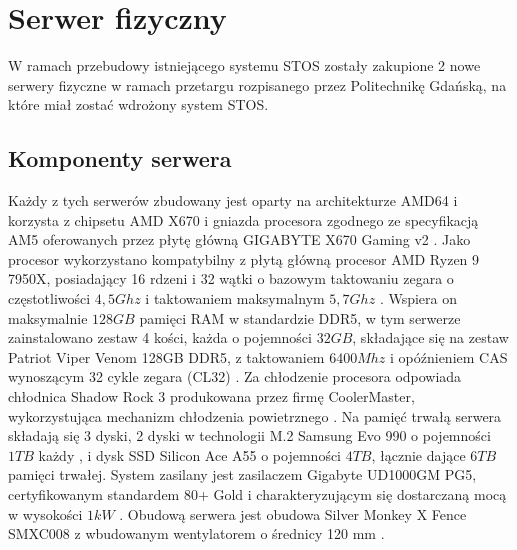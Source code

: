\section{Serwer fizyczny}
W ramach przebudowy istniejącego systemu STOS zostały zakupione 2 nowe serwery fizyczne w ramach przetargu rozpisanego przez Politechnikę Gdańską, na które miał zostać wdrożony system STOS.

\subsection{Komponenty serwera}
Każdy z tych serwerów zbudowany jest oparty na architekturze AMD64 i korzysta z chipsetu AMD X670 i gniazda procesora zgodnego ze specyfikacją AM5 oferowanych przez płytę główną GIGABYTE X670 Gaming v2 \cite{gigabyteX670}. Jako procesor wykorzystano kompatybilny z płytą główną procesor AMD Ryzen 9 7950X, posiadający 16 rdzeni i 32 wątki o bazowym taktowaniu zegara o częstotliwości $4,5 Ghz$ i taktowaniem maksymalnym $5,7 Ghz$ \cite{ryzen}. Wspiera on maksymalnie $128 GB$ pamięci RAM w standardzie DDR5, w tym serwerze zainstalowano zestaw 4 kości, każda o pojemności $32 GB$, składające się na zestaw Patriot Viper Venom 128GB DDR5, z taktowaniem $6400 Mhz$ i opóźnieniem CAS wynoszącym 32 cykle zegara (CL32) \cite{patriotRam}. Za chłodzenie procesora odpowiada chłodnica Shadow Rock 3 produkowana przez firmę CoolerMaster, wykorzystująca mechanizm chłodzenia powietrznego \cite{coolermaster}. Na pamięć trwałą serwera składają się 3 dyski, 2 dyski w technologii M.2 Samsung Evo 990 o pojemności $1 TB$ każdy \cite{samsungSsd}, i dysk SSD Silicon Ace A55 \cite{sataSsd} o pojemności $4 TB$, łącznie dające $6 TB$ pamięci trwałej. System zasilany jest zasilaczem Gigabyte UD1000GM PG5, certyfikowanym standardem 80+ Gold i charakteryzującym się dostarczaną mocą w wysokości $1 kW$ \cite{zasilka}.  Obudową serwera jest obudowa Silver Monkey X Fence SMXC008 z wbudowanym wentylatorem o średnicy 120 mm \cite{obudowa}.

